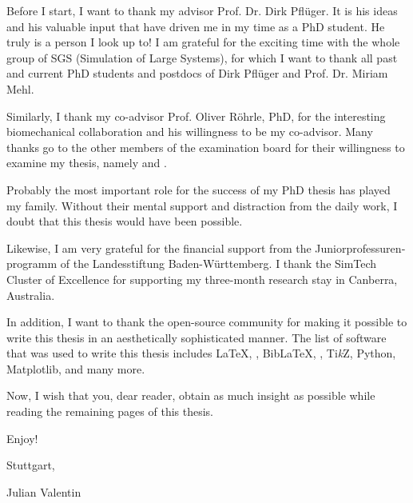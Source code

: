 
Before I start, I want to thank my advisor Prof. Dr. Dirk Pflüger.
It is his ideas and his valuable input that have driven me in
my time as a PhD student.
He truly is a person I look up to!
I am grateful for the exciting time with the whole group of SGS
(Simulation of Large Systems),
for which I want to thank all past and current PhD students and postdocs of
Dirk Pflüger and Prof. Dr. Miriam Mehl.

Similarly, I thank my co-advisor Prof. Oliver Röhrle, PhD, for the
interesting biomechanical collaboration and his willingness to be my co-advisor.
Many thanks go to the other members of the examination board for their
willingness to examine my thesis,
namely  and .

Probably the most important role for the success of my PhD thesis
has played my family.
Without their mental support and distraction from the daily work,
I doubt that this thesis would have been possible.

Likewise, I am very grateful for the financial support from
the \foreignlanguage{ngerman}{Juniorprofessurenprogramm} of the
\foreignlanguage{ngerman}{Landesstiftung Baden-Württemberg}.
I thank the SimTech Cluster of Excellence for supporting
my three-month research stay in Canberra, Australia.

In addition, I want to thank the open-source community for making it possible to
write this thesis in an aesthetically sophisticated manner.
The list of software that was used to write this thesis includes
\LaTeX, \LuaLaTeX, Bib\LaTeX,
\scalebox{0.9}{\KOMAScript}, Ti\emph{k}Z, Python, Matplotlib,
and many more.

\label{page:preface}
Now, I wish that you, dear reader, obtain as much insight as possible
while reading the remaining
 pages of this thesis.

Enjoy!

\vspace{1em}

\noindent
Stuttgart, \thedate

\noindent
Julian Valentin
